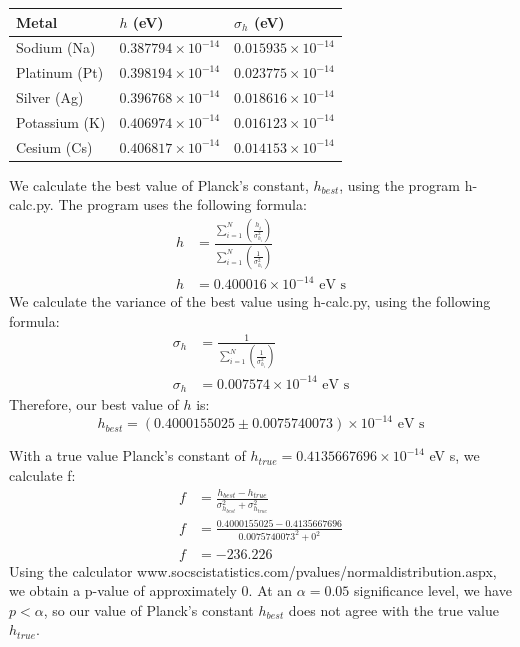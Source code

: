 \documentclass{article}
\begin{document}
\begin{table}[ht]
\begin{tabular}{|l|l|l|}
\hline
Metal         & $h$ (eV)                 & $\sigma_h$ (eV)          \\ \hline
Sodium (Na)   & $0.387794\times10^{-14}$ & $0.015935\times10^{-14}$ \\ \hline
Platinum (Pt) & $0.398194\times10^{-14}$ & $0.023775\times10^{-14}$ \\ \hline
Silver (Ag)   & $0.396768\times10^{-14}$ & $0.018616\times10^{-14}$ \\ \hline
Potassium (K) & $0.406974\times10^{-14}$ & $0.016123\times10^{-14}$ \\ \hline
Cesium (Cs)   & $0.406817\times10^{-14}$ & $0.014153\times10^{-14}$ \\ \hline
\end{tabular}
\end{table}

We calculate the best value of Planck's constant, $h_{best}$, using the program h-calc.py. The program uses the following formula:
\begin{align*}
  h &= \frac{\sum_{i=1}^{N}\left(\frac{h_i}{\sigma_{h_i}^2}\right)}{\sum_{i=1}^{N}\left(\frac{1}{\sigma_{h_i}^2}\right)} \\
  h &= 0.400016\times 10^{-14} \text{ eV s}
\end{align*}
We calculate the variance of the best value using h-calc.py, using the following formula:
\begin{align*}
  \sigma_h &= \frac{1}{\sum_{i=1}^{N}\left(\frac{1}{\sigma_{h_i}^2}\right)} \\
  \sigma_h &= 0.007574\times 10^{-14} \text{ eV s}
\end{align*}
Therefore, our best value of $h$ is:
\begin{equation*}\boxed{h_{best} = (0.4000155025 \pm 0.0075740073) \times 10^{-14} \text{ eV s}}\end{equation*}

With a true value Planck's constant of $h_{true} = 0.4135667696\times 10^{-14}$ eV s, we calculate f:
\begin{align*}
  f &= \frac{h_{best}-h_{true}}{\sigma_{h_{best}}^2 + \sigma_{h_{true}}^2} \\
  f &= \frac{0.4000155025-0.4135667696}{0.0075740073^2 + 0^2} \\
  f &= -236.226
\end{align*}
Using the calculator www.socscistatistics.com/pvalues/normaldistribution.aspx, we obtain a p-value of approximately 0. At an $\alpha=0.05$ significance level, we have $p<\alpha$, so our value of Planck's constant $h_{best}$ does not agree with the true value $h_{true}$.
\end{document}
